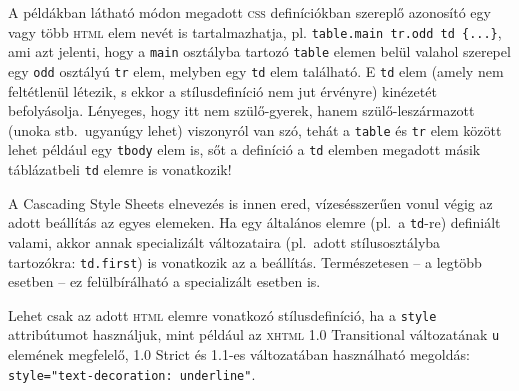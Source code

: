 A példákban látható módon megadott \textsc{css} definíciókban szereplő azonosító
egy vagy több \textsc{html} elem nevét is tartalmazhatja, pl. \texttt{table.main
  tr.odd td \{...\}}, ami azt jelenti, hogy a \texttt{main} osztályba tartozó
\texttt{table} elemen belül valahol szerepel egy \texttt{odd} osztályú
\texttt{tr} elem, melyben egy \texttt{td} elem található. E \texttt{td} elem
(amely nem feltétlenül létezik, s ekkor a stílusdefiníció nem jut érvényre)
kinézetét befolyásolja. Lényeges, hogy itt nem szülő-gyerek, hanem
szülő-leszármazott (unoka stb.\ ugyanúgy lehet) viszonyról van szó, tehát a
\texttt{table} és \texttt{tr} elem között lehet például egy \texttt{tbody} elem
is, sőt a definíció a \texttt{td} elemben megadott másik táblázatbeli
\texttt{td} elemre is vonatkozik!

A Cascading Style Sheets elnevezés is innen ered, vízesésszerűen vonul végig az
adott beállítás az egyes elemeken. Ha egy általános elemre (pl.\ a
\texttt{td}-re) definiált valami, akkor annak specializált változataira (pl.\
adott stílusosztályba tartozókra: \texttt{td.first}) is vonatkozik az a
beállítás. Természetesen -- a legtöbb esetben -- ez felülbírálható a
specializált esetben is.

Lehet csak az adott \textsc{html} elemre vonatkozó stílusdefiníció, ha a
\texttt{style} attribútumot használjuk, mint például az \textsc{xhtml} 1.0
Transitional változatának \texttt{u} elemének megfelelő, 1.0 Strict és 1.1-es
változatában használható megoldás: \texttt{style="text-decoration: underline"}.

